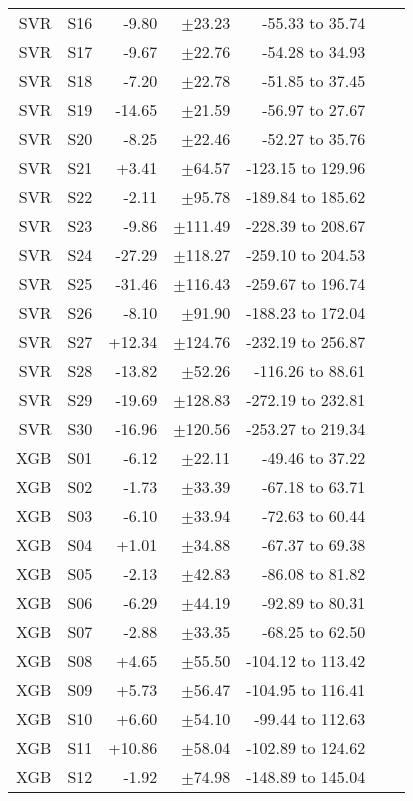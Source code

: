 \begin{table}
\begin{tabular}{rrrrrrr}
  SVR &  S16 &  -9.80 &  $\pm$23.23 &   -55.33 to 35.74 \\
  SVR &  S17 &  -9.67 &  $\pm$22.76 &   -54.28 to 34.93 \\
  SVR &  S18 &  -7.20 &  $\pm$22.78 &   -51.85 to 37.45 \\
  SVR &  S19 & -14.65 &  $\pm$21.59 &   -56.97 to 27.67 \\
  SVR &  S20 &  -8.25 &  $\pm$22.46 &   -52.27 to 35.76 \\
  SVR &  S21 &  +3.41 &  $\pm$64.57 & -123.15 to 129.96 \\
  SVR &  S22 &  -2.11 &  $\pm$95.78 & -189.84 to 185.62 \\
  SVR &  S23 &  -9.86 & $\pm$111.49 & -228.39 to 208.67 \\
  SVR &  S24 & -27.29 & $\pm$118.27 & -259.10 to 204.53 \\
  SVR &  S25 & -31.46 & $\pm$116.43 & -259.67 to 196.74 \\
  SVR &  S26 &  -8.10 &  $\pm$91.90 & -188.23 to 172.04 \\
  SVR &  S27 & +12.34 & $\pm$124.76 & -232.19 to 256.87 \\
  SVR &  S28 & -13.82 &  $\pm$52.26 &  -116.26 to 88.61 \\
  SVR &  S29 & -19.69 & $\pm$128.83 & -272.19 to 232.81 \\
  SVR &  S30 & -16.96 & $\pm$120.56 & -253.27 to 219.34 \\
  XGB &  S01 &  -6.12 &  $\pm$22.11 &   -49.46 to 37.22 \\
  XGB &  S02 &  -1.73 &  $\pm$33.39 &   -67.18 to 63.71 \\
  XGB &  S03 &  -6.10 &  $\pm$33.94 &   -72.63 to 60.44 \\
  XGB &  S04 &  +1.01 &  $\pm$34.88 &   -67.37 to 69.38 \\
  XGB &  S05 &  -2.13 &  $\pm$42.83 &   -86.08 to 81.82 \\
  XGB &  S06 &  -6.29 &  $\pm$44.19 &   -92.89 to 80.31 \\
  XGB &  S07 &  -2.88 &  $\pm$33.35 &   -68.25 to 62.50 \\
  XGB &  S08 &  +4.65 &  $\pm$55.50 & -104.12 to 113.42 \\
  XGB &  S09 &  +5.73 &  $\pm$56.47 & -104.95 to 116.41 \\
  XGB &  S10 &  +6.60 &  $\pm$54.10 &  -99.44 to 112.63 \\
  XGB &  S11 & +10.86 &  $\pm$58.04 & -102.89 to 124.62 \\
  XGB &  S12 &  -1.92 &  $\pm$74.98 & -148.89 to 145.04 \\

\end{tabular}
\end{table}

